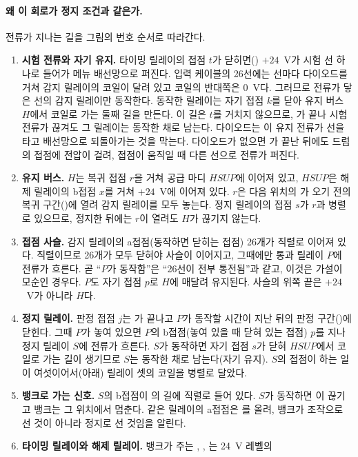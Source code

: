 \paragraph{왜 이 회로가 정지 조건과 같은가.} 전류가 지나는 길을 그림의 번호 순서로 따라간다.

\begin{enumerate}
\item \textbf{시험 전류와 자기 유지.} 타이밍 릴레이의 접점 $t$가 닫히면() $+24$~V가 시험 선
하나로 들어가 메뉴 배선망으로 퍼진다. 입력 케이블의 26선에는 선마다 다이오드를 거쳐 감지 릴레이의 코일이 달려
있고 코일의 반대쪽은 0~V다. 그러므로 전류가 닿은 선의 감지 릴레이만 동작한다. 동작한 릴레이는 자기 접점 $k$를
닫아 유지 버스 $H$에서 코일로 가는 둘째 길을 만든다. 이 길은 $t$를 거치지 않으므로, 가 끝나 시험
전류가 끊겨도 그 릴레이는 동작한 채로 남는다. 다이오드는 이 유지 전류가 선을 타고 배선망으로 되돌아가는 것을
막는다. 다이오드가 없으면 가 끝난 뒤에도 드럼의 접점에 전압이 걸려, 접점이 움직일 때 다른 선으로
전류가 퍼진다.
\item \textbf{유지 버스.} $H$는 복귀 접점 $r$을 거쳐 공급 마디 $HSUP$에 이어져 있고, $HSUP$은 해제 릴레이의
b접점 $x$를 거쳐 $+24$~V에 이어져 있다. $r$은 다음 위치의 가 오기 전의 복귀 구간()에
열려 감지 릴레이를 모두 놓는다. 정지 릴레이의 접점 $s$가 $r$과 병렬로 있으므로, 정지한 뒤에는 $r$이 열려도
$H$가 끊기지 않는다.
\item \textbf{접점 사슬.} 감지 릴레이의 a접점(동작하면 닫히는 접점) 26개가 직렬로 이어져 있다. 직렬이므로
26개가 모두 닫혀야 사슬이 이어지고, 그때에만 통과 릴레이 $P$에 전류가 흐른다. 곧 ``$P$가 동작함''은
``26선이 전부 통전됨''과 같고, 이것은 가설이 모순인 경우다. $P$도 자기 접점 $p$로 $H$에 매달려 유지된다.
사슬의 위쪽 끝은 $+24$~V가 아니라 $H$다.
\item \textbf{정지 릴레이.} 판정 접점 $j$는 가 끝나고 $P$가 동작할 시간이 지난 뒤의 판정
구간()에 닫힌다. 그때 $P$가 놓여 있으면 $P$의 b접점(놓여 있을 때 닫혀 있는 접점) $p$를 지나
정지 릴레이 $S$에 전류가 흐른다. $S$가 동작하면 자기 접점 $s$가 닫혀 $HSUP$에서 코일로 가는 길이 생기므로
$S$는 동작한 채로 남는다(자기 유지). $S$의 접점이 하는 일이 여섯이어서(아래) 릴레이 셋의 코일을 병렬로 달았다.
\item \textbf{뱅크로 가는 신호.} $S$의 b접점이 의 길에 직렬로 들어 있다. $S$가 동작하면 이
끊기고 뱅크는 그 위치에서 멈춘다. 같은 릴레이의 a접점은 를 올려, 뱅크가 조작으로 선 것이
아니라 정지로 선 것임을 알린다.
\item \textbf{타이밍 릴레이와 해제 릴레이.} 뱅크가 주는 , , 는 24~V 레벨의

\end{enumerate}
